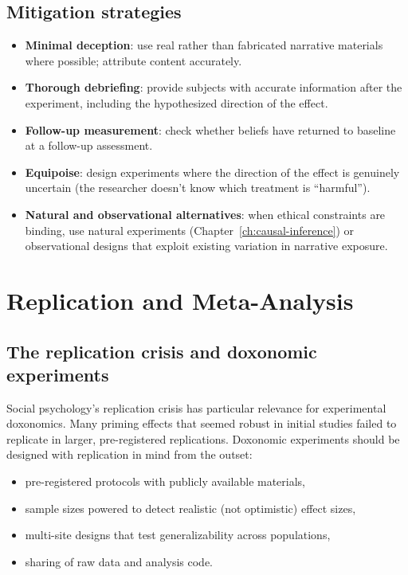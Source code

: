 \subsection{Mitigation strategies}

\begin{itemize}[nosep]
  \item \textbf{Minimal deception}: use real rather than fabricated narrative materials where possible; attribute content accurately.
  \item \textbf{Thorough debriefing}: provide subjects with accurate information after the experiment, including the hypothesized direction of the effect.
  \item \textbf{Follow-up measurement}: check whether beliefs have returned to baseline at a follow-up assessment.
  \item \textbf{Equipoise}: design experiments where the direction of the effect is genuinely uncertain (the researcher doesn't know which treatment is ``harmful'').
  \item \textbf{Natural and observational alternatives}: when ethical constraints are binding, use natural experiments (Chapter~\ref{ch:causal-inference}) or observational designs that exploit existing variation in narrative exposure.
\end{itemize}

\section{Replication and Meta-Analysis}
\label{sec:ch19-replication}

\subsection{The replication crisis and doxonomic experiments}

Social psychology's replication crisis has particular relevance for experimental doxonomics.
Many priming effects that seemed robust in initial studies failed to replicate in larger, pre-registered replications.
Doxonomic experiments should be designed with replication in mind from the outset:
\begin{itemize}[nosep]
  \item pre-registered protocols with publicly available materials,
  \item sample sizes powered to detect realistic (not optimistic) effect sizes,
  \item multi-site designs that test generalizability across populations,
  \item sharing of raw data and analysis code.
\end{itemize}

